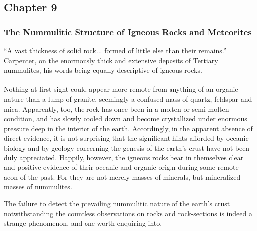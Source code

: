 \documentclass[a4paper, 12pt, oneside, landscape]{article}
\begin{document}
\subsection{Chapter 9}
\subsubsection{The Nummulitic Structure of Igneous Rocks and Meteorites}
\begin{displayquote}
``A vast thickness of solid rock... formed of little else than their remains.'' Carpenter, on the enormously thick and extensive deposits of Tertiary nummulites, his words being equally descriptive of igneous rocks.
\end{displayquote}
\paragraph{}
Nothing at first sight could appear more remote from anything of an organic nature than a lump of granite, seemingly a confused mass of quartz, feldspar and mica. Apparently, too, the rock has once been in a molten or semi-molten condition, and has slowly cooled down and become crystallized under enormous pressure deep in the interior of the earth. Accordingly, in the apparent absence of direct evidence, it is not surprising that the significant hints afforded by oceanic biology and by geology concerning the genesis of the earth's crust have not been duly appreciated. Happily, however, the igneous rocks bear in themselves clear and positive evidence of their oceanic and organic origin during some remote aeon of the past. For they are not merely masses of minerals, but mineralized masses of nummulites.

The failure to detect the prevailing nummulitic nature of the earth's crust notwithstanding the countless observations on rocks and rock-sections is indeed a strange phenomenon, and one worth enquiring into.
\end{document}
